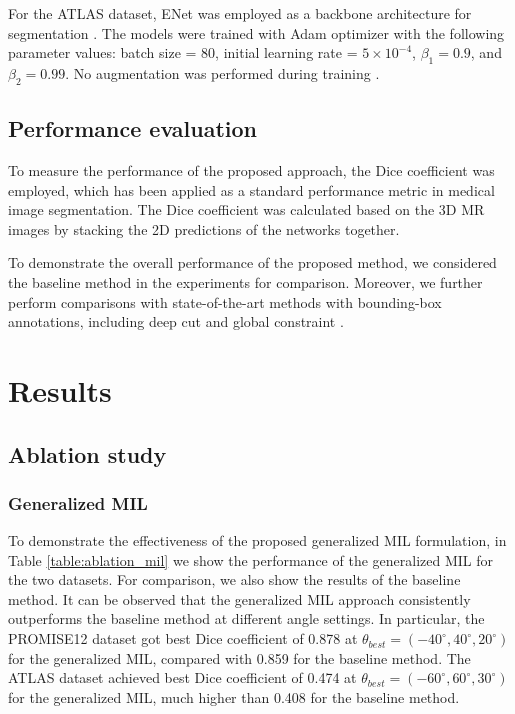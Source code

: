\documentclass[runningheads]{llncs}
\begin{document}
For the ATLAS dataset, ENet \cite{paszke2016enet} was employed as a backbone architecture for segmentation \cite{kervadec2020bounding}. The models were trained with Adam optimizer with the following parameter values: batch size = 80, initial learning rate = $5 \times 10^{-4}$, $\beta_1 = 0.9$, and $\beta_2 = 0.99$. No augmentation was performed during training \cite{kervadec2020bounding}.



\subsection{Performance evaluation}
To measure the performance of the proposed approach, the Dice coefficient was employed, which has been applied as a standard performance metric in medical image segmentation. The Dice coefficient was calculated based on the 3D MR images by stacking the 2D predictions of the networks together.

To demonstrate the overall performance of the proposed method, we considered the baseline method in the experiments for comparison. Moreover, we further perform comparisons with state-of-the-art methods with bounding-box annotations, including deep cut \cite{rajchl2016deepcut} and global constraint \cite{kervadec2020bounding}.

\section{Results}

\subsection{Ablation study}

\subsubsection{Generalized MIL}
To demonstrate the effectiveness of the proposed generalized MIL formulation, in Table \ref{table:ablation_mil} we show the performance of the generalized MIL for the two datasets. For comparison, we also show the results of the baseline method. It can be observed that the generalized MIL approach consistently outperforms the baseline method at different angle settings. In particular, the PROMISE12 dataset got best Dice coefficient of 0.878 at $\theta_{best}=(-40^{\circ},40^{\circ},20^{\circ})$ for the generalized MIL, compared with 0.859 for the baseline method. The ATLAS dataset achieved best Dice coefficient of 0.474 at $\theta_{best}=(-60^{\circ},60^{\circ},30^{\circ})$ for the generalized MIL, much higher than 0.408 for the baseline method.
\end{document}
